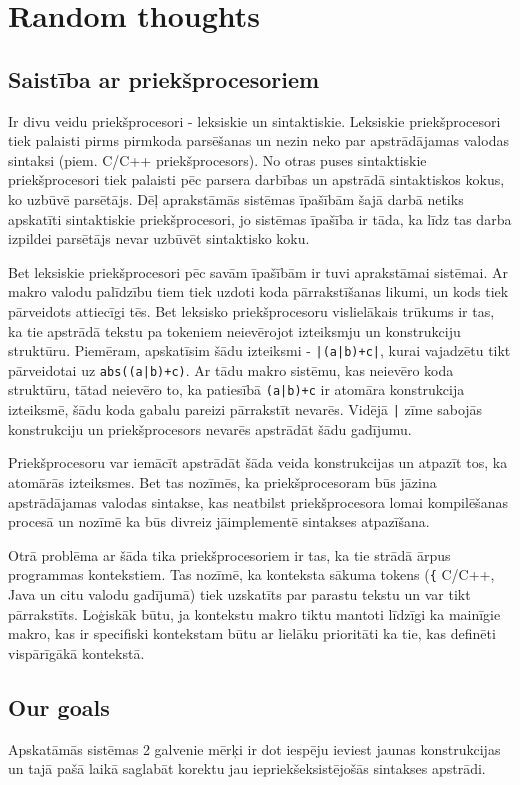 \section{Random thoughts}
\subsection{Saistība ar priekšprocesoriem}
Ir divu veidu priekšprocesori - leksiskie un sintaktiskie. Leksiskie priekšprocesori tiek palaisti pirms pirmkoda parsēšanas un nezin neko par apstrādājamas valodas sintaksi (piem. C/C++ priekšprocesors). No otras puses sintaktiskie priekšprocesori tiek palaisti pēc parsera darbības un apstrādā sintaktiskos kokus, ko uzbūvē parsētājs. Dēļ aprakstāmās sistēmas īpašībām šajā darbā netiks apskatīti sintaktiskie priekšprocesori, jo sistēmas īpašība ir tāda, ka līdz tas darba izpildei parsētājs nevar uzbūvēt sintaktisko koku.

Bet leksiskie priekšprocesori pēc savām īpašībām ir tuvi aprakstāmai sistēmai. Ar makro valodu palīdzību tiem tiek uzdoti koda pārrakstīšanas likumi, un kods tiek pārveidots attiecīgi tēs. Bet leksisko priekšprocesoru vislielākais trūkums ir tas, ka tie apstrādā tekstu pa tokeniem neievērojot izteiksmju un konstrukciju struktūru. Piemēram, apskatīsim šādu izteiksmi - \verb/|(a|b)+c|/, kurai vajadzētu tikt pārveidotai uz \verb/abs((a|b)+c)/. Ar tādu makro sistēmu, kas neievēro koda struktūru, tātad neievēro to, ka patiesībā \verb/(a|b)+c/ ir atomāra konstrukcija izteiksmē, šādu koda gabalu pareizi pārrakstīt nevarēs. Vidējā \verb/|/ zīme sabojās konstrukciju un priekšprocesors nevarēs apstrādāt šādu gadījumu.

Priekšprocesoru var iemācīt apstrādāt šāda veida konstrukcijas un atpazīt tos, ka atomārās izteiksmes. Bet tas nozīmēs, ka priekšprocesoram būs jāzina apstrādājamas valodas sintakse, kas neatbilst priekšprocesora lomai kompilēšanas procesā un nozīmē ka būs divreiz jāimplementē sintakses atpazīšana.

Otrā problēma ar šāda tika priekšprocesoriem ir tas, ka tie strādā ārpus programmas kontekstiem. Tas nozīmē, ka konteksta sākuma tokens (\verb|{| C/C++, Java un citu valodu gadījumā) tiek uzskatīts par parastu tekstu un var tikt pārrakstīts. Loģiskāk būtu, ja kontekstu makro tiktu mantoti līdzīgi ka mainīgie  makro, kas ir specifiski kontekstam būtu ar lielāku prioritāti ka tie, kas definēti vispārīgākā kontekstā. 

\subsection{Our goals}
Apskatāmās sistēmas 2 galvenie mērķi ir dot iespēju ieviest jaunas konstrukcijas un tajā pašā laikā saglabāt korektu jau iepriekšeksistējošās sintakses apstrādi.

